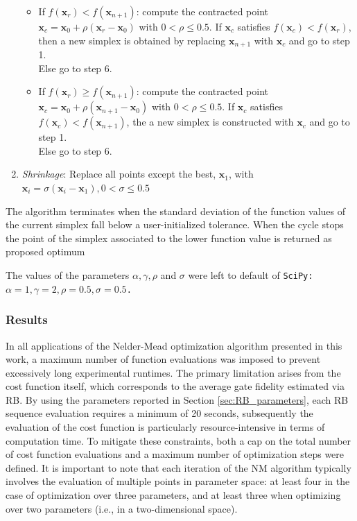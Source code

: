 \begin{enumerate}
\begin{itemize}
        \item If $f(\mathbf{x}_r) < f(\mathbf{x}_{n+1})$: compute the contracted point $\mathbf{x}_c=\mathbf{x}_0 +\rho(\mathbf{x}_{r}-\mathbf{x}_0)$ with $0<\rho \leq 0.5$.
                If $\mathbf{x}_c$ satisfies $f(\mathbf{x}_c) < f(\mathbf{x}_{r})$, then a new simplex is obtained by replacing $\mathbf{x}_{n+1}$ with  $\mathbf{x}_c$ and go to step 1.\\
                Else go to step 6.
        \item  If $f(\mathbf{x}_r) \geq f(\mathbf{x}_{n+1})$: compute the contracted point $\mathbf{x}_c=\mathbf{x}_0 +\rho(\mathbf{x}_{n+1}-\mathbf{x}_0)$ with $0<\rho \leq 0.5$.
                If $\mathbf{x}_c$ satisfies $f(\mathbf{x}_c) < f(\mathbf{x}_{n+1})$, the a new simplex is constructed with $\mathbf{x}_c$ and go to step 1.\\
                Else go to step 6.
    \end{itemize}
    \item \textit{Shrinkage}: Replace all points except the best, $\mathbf{x}_1$, with $\mathbf{x}_i = \sigma(\mathbf{x}_i - \mathbf{x}_1), 0<\sigma \leq 0.5$  
\end{enumerate}
The algorithm terminates when the standard deviation of the function values of the current simplex fall below a user-initialized tolerance. 
When the cycle stops the point of the simplex associated to the lower function value is returned as proposed optimum

The values of the parameters $\alpha, \gamma, \rho$ and $\sigma$ were left to default of \tt{SciPy}: $\alpha=1, \gamma=2, \rho=0.5, \sigma=0.5$. 

\subsubsection{Results}
In all applications of the Nelder-Mead optimization algorithm presented in this work, a maximum number of function evaluations was imposed to prevent excessively long experimental runtimes. 
The primary limitation arises from the cost function itself, which corresponds to the average gate fidelity estimated via RB. 
By using the parameters reported in Section \ref{sec:RB_parameters}, each RB sequence evaluation requires a minimum of 20 seconds, subsequently the evaluation of the cost function is particularly resource-intensive in terms of computation time.
To mitigate these constraints, both a cap on the total number of cost function evaluations and a maximum number of optimization steps were defined. 
It is important to note that each iteration of the NM algorithm typically involves the evaluation of multiple points in parameter space: at least four in the case of optimization over three parameters, and at least three when optimizing over two parameters (i.e., in a two-dimensional space).

